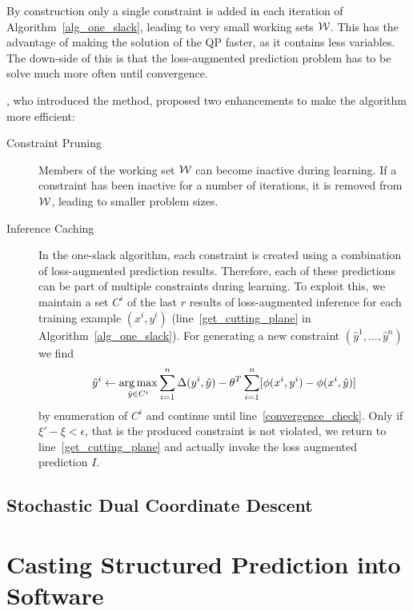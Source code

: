 By construction only a single constraint is added in each iteration of
Algorithm~\ref{alg_one_slack}, leading to very small working sets $\mathcal{W}$.
This has the advantage of making the solution of the QP faster, as it contains
less variables. The down-side of this is that the loss-augmented prediction
problem has to be solve much more often until convergence.

\citet{joachims2009cutting}, who introduced the method, proposed two enhancements
to make the algorithm more efficient:
\begin{description}
    \item[Constraint Pruning] Members of the working set $\mathcal{W}$ can become inactive during learning.
        If a constraint has been inactive for a number of iterations, it is removed from $\mathcal{W}$, leading
        to smaller problem sizes.
    \item[Inference Caching] In the one-slack algorithm, each constraint is
        created using a combination of loss-augmented prediction results.
        Therefore, each of these predictions can be part of multiple
        constraints during learning.
        To exploit this, we maintain a set $C^i$ of the last $r$ results of
        loss-augmented inference for each training example $(x^i, y^i)$
        (line~\ref{get_cutting_plane} in Algorithm~\ref{alg_one_slack}).
        For generating a new constraint $(\hat{y}^1, \dotsc, \hat{y}^n)$ we
        find
        \[ \hat{y}^i \leftarrow \operatorname*{arg\,max}_{\hat{y}\in C^i} \sum_{i=1}^n
            \Delta(y^i, \hat{y}) - \theta^T \sum_{i=1}^n [\phi(x^i, y^i) -
                \phi(x^i, \hat{y})] \]
        by enumeration of $C^i$ and continue until
        line~\ref{convergence_check}.  Only if $\xi' - \xi < \epsilon$, that is
        the produced constraint is not violated, we return to
        line~\ref{get_cutting_plane} and actually invoke the loss augmented
        prediction $I$.
\end{description}


\subsection{Stochastic Dual Coordinate Descent}


\section{Casting Structured Prediction into Software}\label{sec:api}

